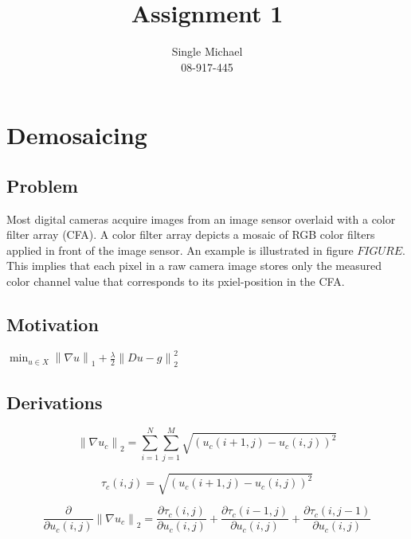 \documentclass{paper}
\title{Assignment 1}
\author{Single Michael\\08-917-445}
\newcommand{\norm}[1]{\left\lVert#1\right\rVert}
\begin{document}
\maketitle


%

\section{Demosaicing}
\subsection{Problem}
Most digital cameras acquire images from an image sensor overlaid with a color filter array (CFA). A color filter array depicts a mosaic of RGB color filters applied in front of the image sensor. An example is illustrated in figure $FIGURE$. This implies that each pixel in a raw camera image stores only the measured color channel value that corresponds to its pxiel-position in the CFA.




\subsection{Motivation}
$\min_{u \in X} \norm{\nabla u}_1 + \frac{\lambda}{2} \norm{Du - g}^2_2$

\subsection{Derivations}


\begin{equation}
	 \norm{\nabla{u_{c}}}_2 
	= \sum_{i=1}^N \sum_{j=1}^M \sqrt{\left( u_{c}\left(i+1, j\right) - u_{c}\left(i,j\right) \right)^2}
\end{equation}

\begin{equation}
	 \tau_{c}\left(i,j\right)
	= \sqrt{\left( u_{c}\left(i+1, j\right) - u_{c}\left(i,j\right) \right)^2}
\end{equation}

\begin{equation}
	\frac{\partial}{\partial u_{c}\left(i,j\right)} \norm{\nabla{u_c}}_2 = \frac{\partial{\tau_{c}\left(i,j\right)}}{\partial u_{c}\left(i,j\right)} + \frac{\partial{\tau_{c}\left(i-1,j\right)}}{\partial u_{c}\left(i,j\right)} + \frac{\partial{\tau_{c}\left(i,j-1\right)}}{\partial u_{c}\left(i,j\right)}
\end{equation}
\end{document}
